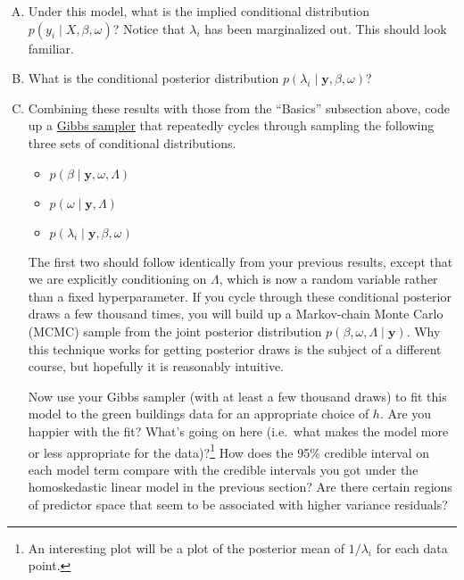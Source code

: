 \documentclass{mynotes}
\newcommand{\by}{\textbf{y}}
\begin{document}
\begin{enumerate}[(A)]


\item Under this model, what is the implied conditional distribution $p(y_i \mid X, \beta, \omega)$?  Notice that $\lambda_i$ has been marginalized out.  This should look familiar.

\item What is the conditional posterior distribution $p(\lambda_i \mid \by, \beta, \omega)$?

\item Combining these results with those from the ``Basics'' subsection above, code up a \href{http://en.wikipedia.org/wiki/Gibbs_sampling}{Gibbs sampler} that repeatedly cycles through sampling the following three sets of conditional distributions.
\begin{itemize}
\item $p(\beta \mid \by, \omega, \Lambda)$
\item $p(\omega \mid \by, \Lambda)$
\item $p(\lambda_i \mid \by, \beta, \omega)$
\end{itemize}
The first two should follow identically from your previous results, except that we are explicitly conditioning on $\Lambda$, which is now a random variable rather than a fixed hyperparameter.  If you cycle through these conditional posterior draws a few thousand times, you will build up a Markov-chain Monte Carlo (MCMC) sample from the joint posterior distribution $p(\beta, \omega, \Lambda \mid \by)$.  Why this technique works for getting posterior draws is the subject of a different course, but hopefully it is reasonably intuitive.

Now use your Gibbs sampler (with at least a few thousand draws) to fit this model to the green buildings data for an appropriate choice of $h$.  Are you happier with the fit?  What's going on here (i.e.~what makes the model more or less appropriate for the data)?\footnote{An interesting plot will be a plot of the posterior mean of $1/\lambda_i$ for each data point.}  How does the 95\% credible interval on each model term compare with the credible intervals you got under the homoskedastic linear model in the previous section?  Are there certain regions of predictor space that seem to be associated with higher variance residuals?  

\end{enumerate}
\end{document}

